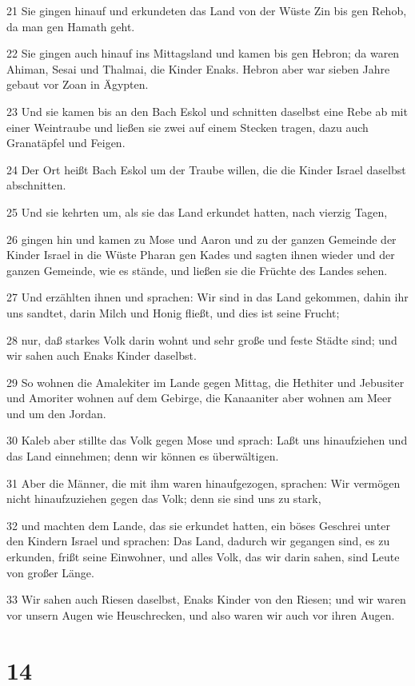 \par 21 Sie gingen hinauf und erkundeten das Land von der Wüste Zin bis gen Rehob, da man gen Hamath geht.
\par 22 Sie gingen auch hinauf ins Mittagsland und kamen bis gen Hebron; da waren Ahiman, Sesai und Thalmai, die Kinder Enaks. Hebron aber war sieben Jahre gebaut vor Zoan in Ägypten.
\par 23 Und sie kamen bis an den Bach Eskol und schnitten daselbst eine Rebe ab mit einer Weintraube und ließen sie zwei auf einem Stecken tragen, dazu auch Granatäpfel und Feigen.
\par 24 Der Ort heißt Bach Eskol um der Traube willen, die die Kinder Israel daselbst abschnitten.
\par 25 Und sie kehrten um, als sie das Land erkundet hatten, nach vierzig Tagen,
\par 26 gingen hin und kamen zu Mose und Aaron und zu der ganzen Gemeinde der Kinder Israel in die Wüste Pharan gen Kades und sagten ihnen wieder und der ganzen Gemeinde, wie es stände, und ließen sie die Früchte des Landes sehen.
\par 27 Und erzählten ihnen und sprachen: Wir sind in das Land gekommen, dahin ihr uns sandtet, darin Milch und Honig fließt, und dies ist seine Frucht;
\par 28 nur, daß starkes Volk darin wohnt und sehr große und feste Städte sind; und wir sahen auch Enaks Kinder daselbst.
\par 29 So wohnen die Amalekiter im Lande gegen Mittag, die Hethiter und Jebusiter und Amoriter wohnen auf dem Gebirge, die Kanaaniter aber wohnen am Meer und um den Jordan.
\par 30 Kaleb aber stillte das Volk gegen Mose und sprach: Laßt uns hinaufziehen und das Land einnehmen; denn wir können es überwältigen.
\par 31 Aber die Männer, die mit ihm waren hinaufgezogen, sprachen: Wir vermögen nicht hinaufzuziehen gegen das Volk; denn sie sind uns zu stark,
\par 32 und machten dem Lande, das sie erkundet hatten, ein böses Geschrei unter den Kindern Israel und sprachen: Das Land, dadurch wir gegangen sind, es zu erkunden, frißt seine Einwohner, und alles Volk, das wir darin sahen, sind Leute von großer Länge.
\par 33 Wir sahen auch Riesen daselbst, Enaks Kinder von den Riesen; und wir waren vor unsern Augen wie Heuschrecken, und also waren wir auch vor ihren Augen.

\chapter{14}

